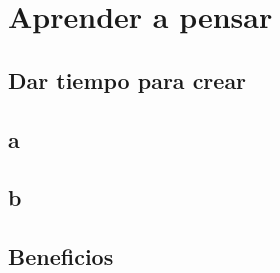 \chapter{Aprender a pensar}
\section{Dar tiempo para crear}
\section{a}
\section{b}
\section{Beneficios}
